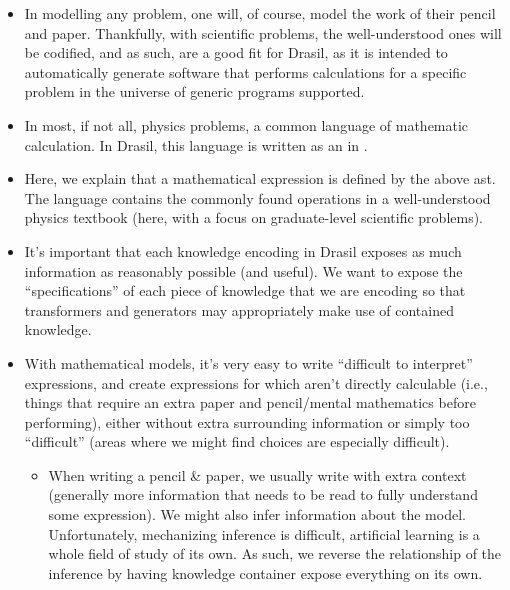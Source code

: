 \begin{itemize}

	\item In modelling any problem, one will, of course, model the work of their
	      pencil and paper. Thankfully, with scientific problems, the
	      well-understood ones will be codified\cite{well-understood}, and as
	      such, are a good fit for Drasil, as it is intended to automatically
	      generate software that performs calculations for a specific problem in
	      the universe of generic programs supported.

	\item In most, if not all, physics problems, a common language of mathematic
	      calculation. In Drasil, this language is written as an  in
	      .

	\item Here, we explain that a mathematical expression is defined by the
	      above \acf{ast}. The language contains the commonly found operations
	      in a well-understood physics textbook (here, with a focus on
	      graduate-level scientific problems).

	\item It's important that each knowledge encoding in Drasil exposes as much
	      information as reasonably possible (and useful). We want to expose the
	      ``specifications'' of each piece of knowledge that we are encoding so
	      that transformers and generators may appropriately make use of
	      contained knowledge.

	\item With mathematical models, it's very easy to write ``difficult to
	      interpret'' expressions, and create expressions for which aren't
	      directly calculable (i.e., things that require an extra paper and
	      pencil/mental mathematics before performing), either without extra
	      surrounding information or simply too ``difficult'' (areas where we
	      might find choices are especially difficult).

	      \begin{itemize}

		      \item When writing a pencil \& paper, we usually write with extra
		            context (generally more information that needs to be read to
		            fully understand some expression). We might also infer
		            information about the model. Unfortunately, mechanizing
		            inference is difficult, artificial learning is a whole field
		            of study of its own. As such, we reverse the relationship of
		            the inference by having knowledge container expose
		            everything on its own.


\end{itemize}
\end{itemize}
